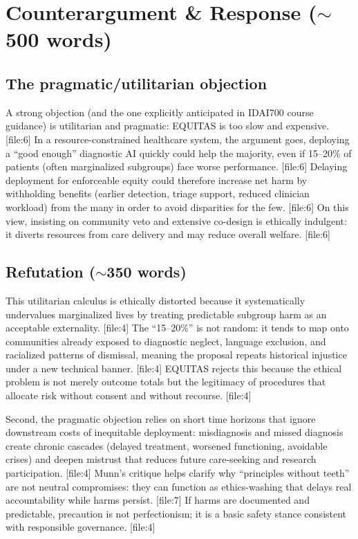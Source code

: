 \documentclass[12pt]{article}
\begin{document}
\section{Counterargument \& Response (\texorpdfstring{$\sim$}{\textasciitilde}500 words)}

\subsection*{The pragmatic/utilitarian objection}
A strong objection (and the one explicitly anticipated in IDAI700 course guidance) is utilitarian and pragmatic: EQUITAS is too slow and expensive. [file:6]
In a resource-constrained healthcare system, the argument goes, deploying a ``good enough'' diagnostic AI quickly could help the majority, even if 15--20\% of patients (often marginalized subgroups) face worse performance. [file:6]
Delaying deployment for enforceable equity could therefore increase net harm by withholding benefits (earlier detection, triage support, reduced clinician workload) from the many in order to avoid disparities for the few. [file:6]
On this view, insisting on community veto and extensive co-design is ethically indulgent: it diverts resources from care delivery and may reduce overall welfare. [file:6]

\subsection*{Refutation (\texorpdfstring{$\sim$}{\textasciitilde}350 words)}
This utilitarian calculus is ethically distorted because it systematically undervalues marginalized lives by treating predictable subgroup harm as an acceptable externality. [file:4]
The ``15--20\%'' is not random: it tends to map onto communities already exposed to diagnostic neglect, language exclusion, and racialized patterns of dismissal, meaning the proposal repeats historical injustice under a new technical banner. [file:4]
EQUITAS rejects this because the ethical problem is not merely outcome totals but the legitimacy of procedures that allocate risk without consent and without recourse. [file:4]

Second, the pragmatic objection relies on short time horizons that ignore downstream costs of inequitable deployment: misdiagnosis and missed diagnosis create chronic cascades (delayed treatment, worsened functioning, avoidable crises) and deepen mistrust that reduces future care-seeking and research participation. [file:4]
Munn's critique helps clarify why ``principles without teeth'' are not neutral compromises: they can function as ethics-washing that delays real accountability while harms persist. [file:7]
If harms are documented and predictable, precaution is not perfectionism; it is a basic safety stance consistent with responsible governance. [file:4]
\end{document}
